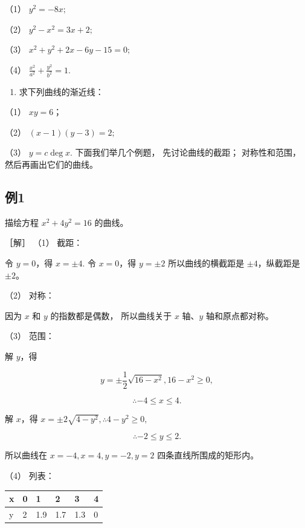 （1） \(y^{2} = -8x;\)

（2） \(y^{2}-x^{2}=3x+2;\)

（3） \(x^{2} + y^{2} + 2x - 6y - 15 = 0;\)

（4） \(\frac{x^2}{a^2} + \frac{y^2}{b^2} = 1.\)

\begin{enumerate}
\def\labelenumi{\arabic{enumi}.}
\setcounter{enumi}{3}
\tightlist
\item
  求下列曲线的渐近线：
\end{enumerate}

（1） \(xy = 6\)；

（2） \((x - 1)(y - 3) = 2;\)

（3） \(y = c\deg x.\) 下面我们举几个例题， 先讨论曲线的截距；
对称性和范围， 然后再画出它们的曲线。

\subsection{例1}\label{ux4f8b1-10}

描绘方程 \(x^{2}+4y^{2}=16\) 的曲线。

［解］ （1） 截距：

令 \(y = 0\)，得 \(x = \pm 4.\) 令 \(x = 0\)，得 \(y = \pm 2\)
所以曲线的横截距是 \(\pm 4\)，纵截距是 \(\pm 2\)。

（2） 对称：

因为 \(x\) 和 \(y\) 的指数都是偶数， 所以曲线关于 \(x\) 轴、\(y\)
轴和原点都对称。

（3） 范围：

解 \(y\)，得

\[
y = \pm \frac {1}{2} \sqrt {16 - x^{2}}, 16 - x^{2} \geqslant 0,
\]

\[
\therefore - 4 \leqslant x \leqslant 4.
\]

解 \(x\)，得 \(x = \pm 2\sqrt{4 - y^2},\therefore 4 - y^2\geqslant 0,\)

\[
\therefore - 2 \leqslant y \leqslant 2.
\]

所以曲线在 \(x = -4, x = 4, y = -2, y = 2\) 四条直线所围成的矩形内。

（4） 列表：

{\def\LTcaptype{none} %
\begin{longtable}[]{@{}llllll@{}}
\toprule\noalign{}
x & 0 & 1 & 2 & 3 & 4 \\
\midrule\noalign{}
\endhead
\bottomrule\noalign{}
\endlastfoot
y & 2 & 1.9 & 1.7 & 1.3 & 0 \\
\end{longtable}
}


